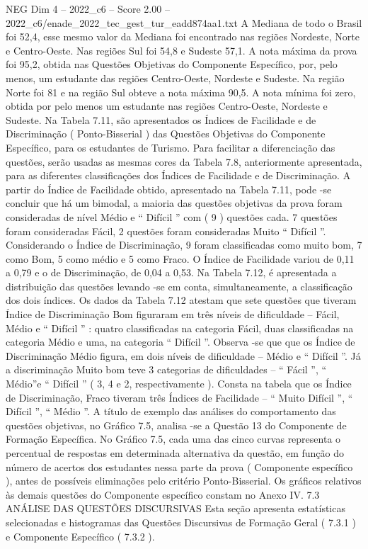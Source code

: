 \begin{textsample}{NEG Dim 4 – 2022\_c6 – Score 2.00 – 2022\_c6/enade\_2022\_tec\_gest\_tur\_eadd874aa1.txt}
A Mediana de todo o Brasil foi 52,4, esse mesmo valor da Mediana foi encontrado nas regiões Nordeste, Norte e Centro-Oeste.
Nas regiões Sul foi 54,8 e Sudeste 57,1.
A nota máxima da prova foi 95,2, obtida nas Questões Objetivas do Componente Específico, por, pelo menos, um estudante das regiões Centro-Oeste, Nordeste e Sudeste.
Na região Norte foi 81 e na região Sul obteve a nota máxima 90,5.
A nota mínima foi zero, obtida por pelo menos um estudante nas regiões Centro-Oeste, Nordeste e Sudeste.
Na Tabela 7.11, são apresentados os Índices de Facilidade e de Discriminação ( Ponto-Bisserial ) das Questões Objetivas do Componente Específico, para os estudantes de Turismo.
Para facilitar a diferenciação das questões, serão usadas as mesmas cores da Tabela 7.8, anteriormente apresentada, para as diferentes classificações dos Índices de Facilidade e de Discriminação.
A partir do Índice de Facilidade obtido, apresentado na Tabela 7.11, pode -se concluir que há um bimodal, a maioria das questões objetivas da prova foram consideradas de nível Médio e “ Difícil ” com ( 9 ) questões cada. 7 questões foram consideradas Fácil, 2 questões foram consideradas Muito “ Difícil ”.
Considerando o Índice de Discriminação, 9 foram classificadas como muito bom, 7 como Bom, 5 como médio e 5 como Fraco.
O Índice de Facilidade variou de 0,11 a 0,79 e o de Discriminação, de 0,04 a 0,53.
Na Tabela 7.12, é apresentada a distribuição das questões levando -se em conta, simultaneamente, a classificação dos dois índices.
Os dados da Tabela 7.12 atestam que sete questões que tiveram Índice de Discriminação Bom figuraram em três níveis de dificuldade – Fácil, Médio e “ Difícil ” : quatro classificadas na categoria Fácil, duas classificadas na categoria Médio e uma, na categoria “ Difícil ”.
Observa -se que que os Índice de Discriminação Médio figura, em dois níveis de dificuldade – Médio e “ Difícil ”.
Já a discriminação Muito bom teve 3 categorias de dificuldades – “ Fácil ”, “ Médio”e “ Difícil ” ( 3, 4 e 2, respectivamente ).
Consta na tabela que os Índice de Discriminação, Fraco tiveram três Índices de Facilidade – “ Muito Difícil ”, “ Difícil ”, “ Médio ”.
A título de exemplo das análises do comportamento das questões objetivas, no Gráfico 7.5, analisa -se a Questão 13 do Componente de Formação Específica.
No Gráfico 7.5, cada uma das cinco curvas representa o percentual de respostas em determinada alternativa da questão, em função do número de acertos dos estudantes nessa parte da prova ( Componente específico ), antes de possíveis eliminações pelo critério Ponto-Bisserial.
Os gráficos relativos às demais questões do Componente específico constam no Anexo IV. 7.3 ANÁLISE DAS QUESTÕES DISCURSIVAS Esta seção apresenta estatísticas selecionadas e histogramas das Questões Discursivas de Formação Geral ( 7.3.1 ) e Componente Específico ( 7.3.2 ).

\end{textsample}
